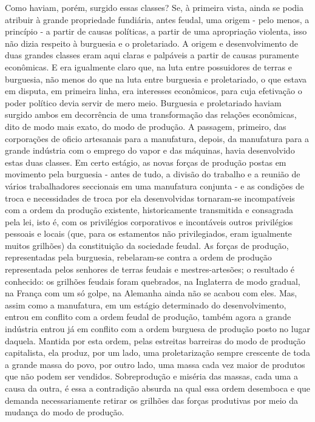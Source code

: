 Como haviam, porém, surgido essas classes? Se, à primeira vista, ainda
se podia atribuir à grande propriedade fundiária, antes feudal, uma
origem - pelo menos, a princípio - a partir de causas políticas, a
partir de uma apropriação violenta, isso não dizia respeito à burguesia
e o proletariado. A origem e desenvolvimento de duas grandes classes
eram aqui claras e palpáveis a partir de causas puramente econômicas. E
era igualmente claro que, na luta entre possuidores de terras e
burguesia, não menos do que na luta entre burguesia e proletariado, o
que estava em disputa, em primeira linha, era interesses econômicos,
para cuja efetivação o poder político devia servir de mero meio.
Burguesia e proletariado haviam surgido ambos em decorrência de uma
transformação das relações econômicas, dito de modo mais exato, do modo
de produção. A passagem, primeiro, das corporações de oficio artesanais
para a manufatura, depois, da manufatura para a grande indústria com o
emprego do vapor e das máquinas, havia desenvolvido estas duas classes.
Em certo estágio, as novas forças de produção postas em movimento pela
burguesia - antes de tudo, a divisão do trabalho e a reunião de vários
trabalhadores seccionais em uma manufatura conjunta - e as condições de
troca e necessidades de troca por ela desenvolvidas tornaram-se
incompatíveis com a ordem da produção existente, historicamente
transmitida e consagrada pela lei, isto é, com os privilégios
corporativos e incontáveis outros privilégios pessoais e locais (que,
para os estamentos não privilegiados, eram igualmente muitos grilhões)
da constituição da sociedade feudal. As forças de produção,
representadas pela burguesia, rebelaram-se contra a ordem de produção
representada pelos senhores de terras feudais e mestres-artesões; o
resultado é conhecido: os grilhões feudais foram quebrados, na
Inglaterra de modo gradual, na França com um só golpe, na Alemanha ainda
não se acabou com eles. Mas, assim como a manufatura, em um estágio
determinado do desenvolvimento, entrou em conflito com a ordem feudal de
produção, também agora a grande indústria entrou já em conflito com a
ordem burguesa de produção posto no lugar daquela. Mantida por esta
ordem, pelas estreitas barreiras do modo de produção capitalista, ela
produz, por um lado, uma proletarização sempre crescente de toda a
grande massa do povo, por outro lado, uma massa cada vez maior de
produtos que não podem ser vendidos. Sobreprodução e miséria das massas,
cada uma a causa da outra, é essa a contradição absurda na qual essa
ordem desemboca e que demanda necessariamente retirar os grilhões das
forças produtivas por meio da mudança do modo de produção.

